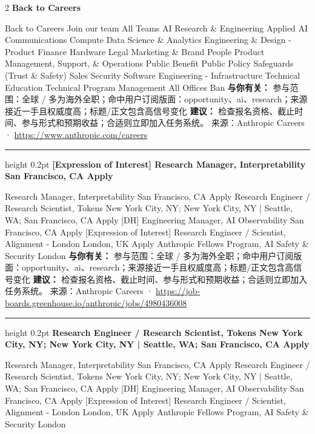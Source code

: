 \documentclass[10.5pt]{ctexart}
\begin{document}
\begin{multicols}{2}
{\large\bfseries Back to Careers}\par
Back to Careers Join our team All Teams AI Research \& Engineering Applied AI Communications Compute Data Science \& Analytics Engineering \& Design - Product Finance Hardware Legal Marketing \& Brand People Product Management, Support, \& Operations Public Benefit Public Policy Safeguards (Trust \& Safety) Sales Security Software Engineering - Infrastructure Technical Education Technical Program Management All Offices Ban
\textbf{与你有关：} 参与范围：全球 / 多为海外全职；命中用户订阅版面：opportunity、ai、research；来源接近一手且权威度高；标题/正文包含高信号变化
\textbf{建议：} 检查报名资格、截止时间、参与形式和预期收益；合适则立即加入任务系统。
{\footnotesize\color{ormuted} 来源：Anthropic Careers · \url{https://www.anthropic.com/careers}}
\vspace{2mm}
\hrule height 0.2pt
\vspace{2mm}
{\large\bfseries [Expression of Interest] Research Manager, Interpretability San Francisco, CA Apply}\par
[Expression of Interest] Research Manager, Interpretability San Francisco, CA Apply Research Engineer / Research Scientist, Tokens New York City, NY; New York City, NY | Seattle, WA; San Francisco, CA Apply [DH] Engineering Manager, AI Observability San Francisco, CA Apply [Expression of Interest] Research Engineer / Scientist, Alignment - London London, UK Apply Anthropic Fellows Program, AI Safety \& Security London
\textbf{与你有关：} 参与范围：全球 / 多为海外全职；命中用户订阅版面：opportunity、ai、research；来源接近一手且权威度高；标题/正文包含高信号变化
\textbf{建议：} 检查报名资格、截止时间、参与形式和预期收益；合适则立即加入任务系统。
{\footnotesize\color{ormuted} 来源：Anthropic Careers · \url{https://job-boards.greenhouse.io/anthropic/jobs/4980436008}}
\vspace{2mm}
\hrule height 0.2pt
\vspace{2mm}
{\large\bfseries Research Engineer / Research Scientist, Tokens New York City, NY; New York City, NY | Seattle, WA; San Francisco, CA Apply}\par
[Expression of Interest] Research Manager, Interpretability San Francisco, CA Apply Research Engineer / Research Scientist, Tokens New York City, NY; New York City, NY | Seattle, WA; San Francisco, CA Apply [DH] Engineering Manager, AI Observability San Francisco, CA Apply [Expression of Interest] Research Engineer / Scientist, Alignment - London London, UK Apply Anthropic Fellows Program, AI Safety \& Security London

\end{multicols}
\end{document}
